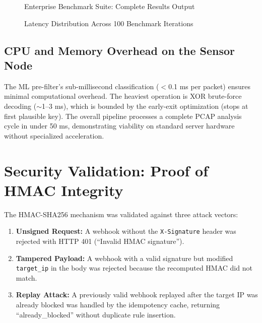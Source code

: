 \begin{figure}[h]
\centering
{}
\caption{Enterprise Benchmark Suite: Complete Results Output}
\label{fig:benchmark_output}
\end{figure}

\begin{figure}[h]
\centering
{}
\caption{Latency Distribution Across 100 Benchmark Iterations}
\label{fig:latency_graph}
\end{figure}

\subsection{CPU and Memory Overhead on the Sensor Node}

The ML pre-filter's sub-millisecond classification ($<$0.1 ms per packet) ensures minimal computational overhead. The heaviest operation is XOR brute-force decoding ($\sim$1--3 ms), which is bounded by the early-exit optimization (stops at first plausible key). The overall pipeline processes a complete PCAP analysis cycle in under 50 ms, demonstrating viability on standard server hardware without specialized acceleration.

\section{Security Validation: Proof of HMAC Integrity}

The HMAC-SHA256 mechanism was validated against three attack vectors:

\begin{enumerate}
    \item \textbf{Unsigned Request:} A webhook without the \texttt{X-Signature} header was rejected with HTTP 401 (``Invalid HMAC signature'').
    \item \textbf{Tampered Payload:} A webhook with a valid signature but modified \texttt{target\_ip} in the body was rejected because the recomputed HMAC did not match.
    \item \textbf{Replay Attack:} A previously valid webhook replayed after the target IP was already blocked was handled by the idempotency cache, returning ``already\_blocked'' without duplicate rule insertion.
\end{enumerate}

